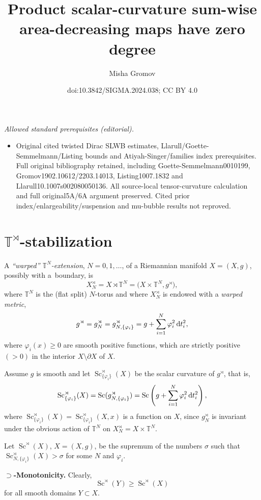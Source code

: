 \documentclass[10pt,a4paper]{amsart}
\title{Product scalar-curvature sum-wise area-decreasing maps have zero degree}
\author{Misha Gromov}
\date{doi:10.3842/SIGMA.2024.038; CC BY 4.0}
\numberwithin{equation}{section}
\begin{document}
\maketitle
\noindent\textit{Allowed standard prerequisites (editorial).}\begin{itemize}
\item Original cited twisted Dirac SLWB estimates, Llarull/Goette-Semmelmann/Listing bounds and Atiyah-Singer/families index prerequisites. Full original bibliography retained, including Goette-Semmelmann0010199, Gromov1902.10612/2203.14013, Listing1007.1832 and Llarull10.1007s002080050136. All source-local tensor-curvature calculation and full original5A/6A argument preserved. Cited prior index/enlargeability/suspension and mu-bubble results not reproved.
\end{itemize}\medskip
\section[T\^{}\{rtimes\}-stabilization]{$\boldsymbol{\mathbb T^\rtimes}$-stabilization}

A {\it ``warped'' $\mathbb T^N$-extension}, $N=0,1,\dots$,
of a Riemannian manifold $X=(X,g)$, possibly with a~boundary, is
\[
X_N^\rtimes=X\rtimes \mathbb T^N = \bigl(X\times \mathbb T^N, g^\rtimes\bigr),
\]
 where $\mathbb T^N$ is the (flat split) $N$-torus and where $X_N^\rtimes$ is endowed with a {\it warped metric},
\[
g^\rtimes= g_N^\rtimes =g_{N,\{\varphi_i\}}^\rtimes=g+\sum_{i=1}^N\varphi_i^2\,{\rm d}t_i^2,
\]
where
 $\varphi_i(x)\geq 0$ are smooth positive functions, which are strictly positive $(>0)$ in the interior $X\setminus \partial X$ of $X$.

Assume $g$ is smooth and let $\operatorname{Sc}^\rtimes_{\{\varphi_i\}} (X)$ be the scalar curvature of $g^\rtimes$, that is,
\[
\operatorname{Sc}^\rtimes_{\{\varphi_i\}} (X)=\operatorname{Sc}(g_{N,\{\varphi_i\}}^\rtimes)=\operatorname{Sc}\left(g+\sum_{i=1}^N\varphi_i^2\,{\rm d}t_i^2\right),
 \]
 where $\operatorname{Sc}^\rtimes_{\{\varphi_i\}} (X)=\operatorname{Sc}^\rtimes_{\{\varphi_i\}} (X,x)$ is a function on $X$, since $g_N^\rtimes$ is invariant under the obvious action of $\mathbb T^N$ on $X_N^\rtimes=X\times \mathbb T^N$.

Let $\operatorname{Sc}^\rtimes (X)$, $X=(X,g)$, be the supremum of the numbers $\sigma$ such that
 $\operatorname{Sc}_{N,\{\varphi_i\} }^\rtimes (X)>\sigma$ for some $N$ and $ \varphi_i$.

\textbf{$\boldsymbol{\supset}$-Monotonicity.} Clearly,
\[
\operatorname{Sc}^\rtimes (Y)\geq \operatorname{Sc}^\rtimes (X)
\]
 for all smooth domains $Y\subset X$.
\end{document}
